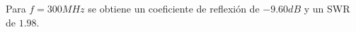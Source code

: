 \documentclass[11pt]{book}
\begin{document}
Para $f=300MHz$ se obtiene un coeficiente de reflexión de $-9.60dB$ y un SWR de $1.98$. 



\begin{figure}[h]
	\centering
	\subfloat[]{
}
\end{figure}
\end{document}

